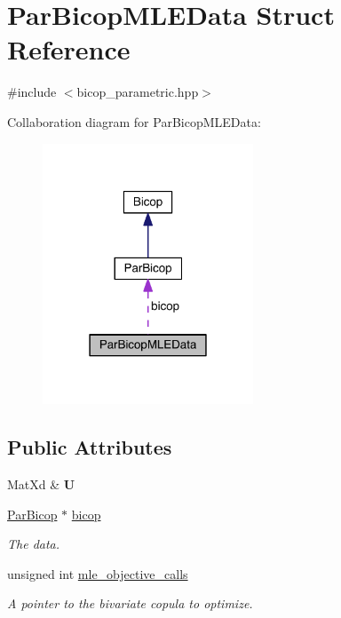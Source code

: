 \hypertarget{struct_par_bicop_m_l_e_data}{}\section{Par\+Bicop\+M\+L\+E\+Data Struct Reference}
\label{struct_par_bicop_m_l_e_data}


{\ttfamily \#include $<$bicop\+\_\+parametric.\+hpp$>$}



Collaboration diagram for Par\+Bicop\+M\+L\+E\+Data\+:
\nopagebreak
\begin{figure}[H]
\begin{center}
\leavevmode
\includegraphics[width=178pt]{struct_par_bicop_m_l_e_data__coll__graph}
\end{center}
\end{figure}
\subsection*{Public Attributes}
\begin{DoxyCompactItemize}
\item 
\mbox{\label{struct_par_bicop_m_l_e_data_af81673f8099b0219544cd2d56a6619db}} 
Mat\+Xd \& {\bfseries U}
\item 
\mbox{\label{struct_par_bicop_m_l_e_data_a3dc24c78fe0aaefcda18379eea833d2e}} 
\hyperlink{class_par_bicop}{Par\+Bicop} $\ast$ \hyperlink{struct_par_bicop_m_l_e_data_a3dc24c78fe0aaefcda18379eea833d2e}{bicop}
\begin{DoxyCompactList}\small\item\em The data. \end{DoxyCompactList}\item 
\mbox{\label{struct_par_bicop_m_l_e_data_a7348a3ec361c354bcf676f1f8ec7140a}} 
unsigned int \hyperlink{struct_par_bicop_m_l_e_data_a7348a3ec361c354bcf676f1f8ec7140a}{mle\+\_\+objective\+\_\+calls}
\begin{DoxyCompactList}\small\item\em A pointer to the bivariate copula to optimize. \end{DoxyCompactList}\end{DoxyCompactItemize}


